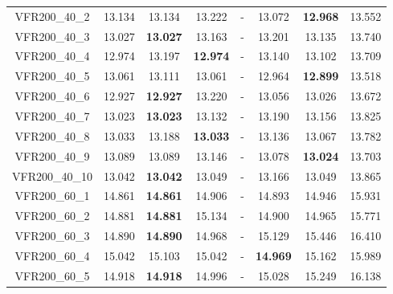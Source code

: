 \begin{tabular}{cc|ccc|ccc}
VFR200\_40\_2      & 13.134           & 13.134           & 13.222           & -                & 13.072           & {\bf 12.968}     & 13.552          \\ 
VFR200\_40\_3      & 13.027           & {\bf 13.027}     & 13.163           & -                & 13.201           & 13.135           & 13.740          \\ 
VFR200\_40\_4      & 12.974           & 13.197           & {\bf 12.974}     & -                & 13.140           & 13.102           & 13.709          \\ 
VFR200\_40\_5      & 13.061           & 13.111           & 13.061           & -                & 12.964           & {\bf 12.899}     & 13.518          \\ 
VFR200\_40\_6      & 12.927           & {\bf 12.927}     & 13.220           & -                & 13.056           & 13.026           & 13.672          \\ 
VFR200\_40\_7      & 13.023           & {\bf 13.023}     & 13.132           & -                & 13.190           & 13.156           & 13.825          \\ 
VFR200\_40\_8      & 13.033           & 13.188           & {\bf 13.033}     & -                & 13.136           & 13.067           & 13.782          \\ 
VFR200\_40\_9      & 13.089           & 13.089           & 13.146           & -                & 13.078           & {\bf 13.024}     & 13.703          \\ 
VFR200\_40\_10     & 13.042           & {\bf 13.042}     & 13.049           & -                & 13.166           & 13.049           & 13.865          \\ 
VFR200\_60\_1      & 14.861           & {\bf 14.861}     & 14.906           & -                & 14.893           & 14.946           & 15.931          \\ 
VFR200\_60\_2      & 14.881           & {\bf 14.881}     & 15.134           & -                & 14.900           & 14.965           & 15.771          \\ 
VFR200\_60\_3      & 14.890           & {\bf 14.890}     & 14.968           & -                & 15.129           & 15.446           & 16.410          \\ 
VFR200\_60\_4      & 15.042           & 15.103           & 15.042           & -                & {\bf 14.969}     & 15.162           & 15.989          \\ 
VFR200\_60\_5      & 14.918           & {\bf 14.918}     & 14.996           & -                & 15.028           & 15.249           & 16.138          \\ 

\end{tabular}
